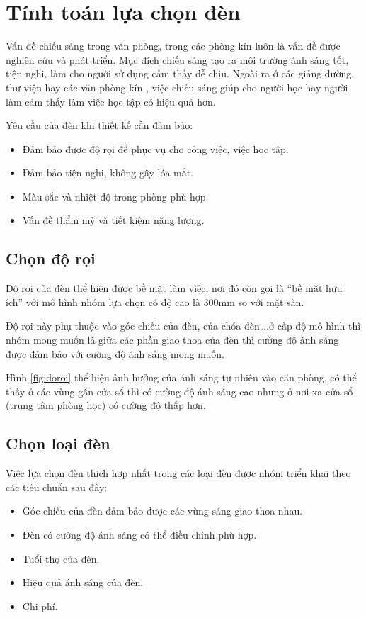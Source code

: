\section{Tính toán lựa chọn đèn}
Vấn đề chiếu sáng trong văn phòng, trong các phòng kín luôn là vấn đề được nghiên cứu và phát triển. Mục đích chiếu sáng tạo ra môi trường ánh sáng tốt, tiện nghi, làm cho người sử dụng cảm thấy dễ chịu. Ngoài ra ở các giảng đường, thư viện hay các văn phòng kín , việc chiếu sáng giúp cho người học hay người làm cảm thấy làm việc học tập có hiệu quả hơn.

Yêu cầu của đèn khi thiết kế cần đảm bảo:
\begin{itemize}
\item Đảm bảo được độ rọi để phục vụ cho công việc, việc học tập.
\item Đảm bảo tiện nghi, không gây lóa mắt.
\item Màu sắc và nhiệt độ trong phòng phù hợp.
\item Vấn đề thẩm mỹ và tiết kiệm năng lượng.	
\end{itemize}

\subsection{Chọn độ rọi}
Độ rọi của đèn thể hiện được bề mặt làm việc, nơi đó còn gọi là “bề mặt hữu ích” với mô hình nhóm lựa chọn có độ cao là 300mm so với mặt sàn.

 Độ rọi này phụ thuộc vào góc chiếu của đèn, của chóa đèn….ở cấp độ mô hình thì nhóm mong muốn là giữa các phần giao thoa của đèn thì cường độ ánh sáng được đảm bảo với cường độ ánh sáng mong muốn.
 
 Hình \ref{fig:doroi} thể hiện ảnh hưởng của ánh sáng tự nhiên vào căn phòng, có thể thấy ở các vùng gần cửa sổ thì có cường độ ánh sáng cao nhưng ở nơi xa cửa sổ (trung tâm phòng học) có cường độ thấp hơn.

\subsection{Chọn loại đèn}
Việc lựa chọn đèn thích hợp nhất trong các loại đèn được nhóm triển khai theo các tiêu chuẩn sau đây:
\begin{itemize}
\item Góc chiếu của đèn đảm bảo được các vùng sáng giao thoa nhau.
\item Đèn có cường độ ánh sáng có thể điều chỉnh phù hợp.
\item Tuổi thọ của đèn.
\item Hiệu quả ánh sáng của đèn.
\item Chi phí.
\end{itemize}

